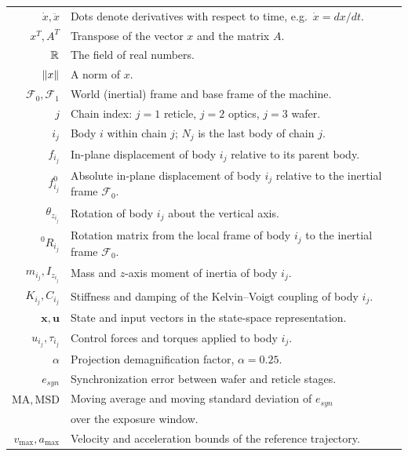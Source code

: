 \def\baselinestretch{1}

 \vspace{-1cm}

\setlength{\tabcolsep}{0.5cm}
\begin{tabular}{rl}
        $\dot{x},\ddot{x}$ & Dots denote derivatives with respect to time, e.g.\ $\dot{x}=dx/dt$.\\
        $x^T,A^T$ & Transpose of the vector $x$ and the matrix $A$.\\
        $\mathbb R$ & The field of real numbers.\\
        $\left\Vert x\right\Vert$ & A norm of $x$.\\
        $\mathcal{F}_0,\mathcal{F}_1$ & World (inertial) frame and base frame of the machine.\\
        $j$ & Chain index: $j=1$ reticle, $j=2$ optics, $j=3$ wafer.\\
        $i_j$ & Body $i$ within chain $j$; $N_j$ is the last body of chain $j$.\\
        $f_{i_j}$ & In-plane displacement of body $i_j$ relative to its parent body.\\
        $f^0_{i_j}$ & Absolute in-plane displacement of body $i_j$ relative to the inertial frame $\mathcal{F}_0$.\\
        $\theta_{z_{i_j}}$ & Rotation of body $i_j$ about the vertical axis.\\
        ${}^0R_{i_j}$ & Rotation matrix from the local frame of body $i_j$ to the inertial frame $\mathcal{F}_0$.\\
        $m_{i_j},I_{z_{i_j}}$ & Mass and $z$-axis moment of inertia of body $i_j$.\\
        $K_{i_j},C_{i_j}$ & Stiffness and damping of the Kelvin--Voigt coupling of body $i_j$.\\
        $\mathbf{x}, \mathbf{u}$ & State and input vectors in the state-space representation.\\
        $u_{i_j}, \tau_{i_j}$ & Control forces and torques applied to body $i_j$.\\
        $\alpha$ & Projection demagnification factor, $\alpha = 0.25$.\\
        $e_{syn}$ & Synchronization error between wafer and reticle stages.\\
        $\mathrm{MA},\mathrm{MSD}$ & Moving average and moving standard deviation of $e_{syn}$\\
        & over the exposure window.\\
        $v_{\max},a_{\max}$ & Velocity and acceleration bounds of the reference trajectory.\\

\end{tabular}
